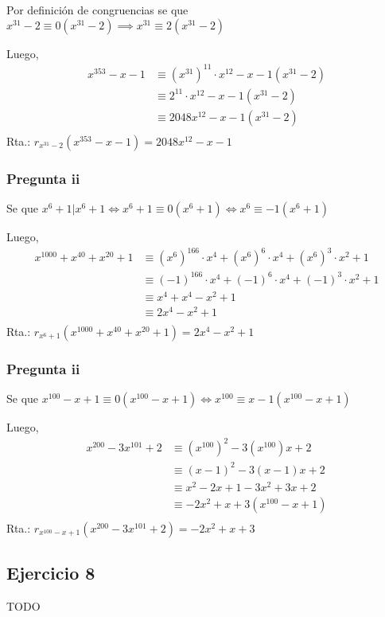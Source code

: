 Por definición de congruencias se que $ x^{31} - 2 \equiv 0(x^{31} - 2) \implies x^{31} \equiv 2(x^{31} - 2) $

Luego,
\begin{align*}
    x^{353} - x - 1 &\equiv (x^{31})^11 \cdot x^{12} - x - 1 (x^{31} - 2) \\
    &\equiv 2^11 \cdot x^{12} - x - 1 (x^{31} - 2) \\
    &\equiv 2048x^{12} - x - 1 (x^{31} - 2)\\
\end{align*}
Rta.: $ r_{x^{31} - 2}(x^{353} - x - 1) = 2048x^{12} - x - 1 $

\subsubsection{Pregunta ii}

Se que $ x^{6} + 1 | x^6 + 1 \iff x^6 + 1 \equiv 0 (x^6 + 1) \iff x^6 \equiv -1 (x^6 + 1) $

Luego,
\begin{align*}
    x^{1000} + x^{40} + x^{20} + 1 &\equiv (x^6)^{166} \cdot x^4 + (x^6)^6 \cdot x^4 + (x^6)^3 \cdot x^2 + 1 \\
    &\equiv (-1)^{166} \cdot x^4 + (-1)^6 \cdot x^4 + (-1)^3 \cdot x^2 + 1 \\
    &\equiv x^4 + x^4 - x^2 + 1 \\
    &\equiv 2x^4 - x^2 + 1 \\
\end{align*}
Rta.: $ r_{x^6 + 1}(x^{1000} + x^{40} + x^{20} + 1) = 2x^4 - x^2 + 1 $

\subsubsection{Pregunta ii}

Se que $ x^{100} - x + 1 \equiv 0 (x^{100} - x + 1) \iff x^{100} \equiv x-1(x^{100} -x + 1) $

Luego,
\begin{align*}
    x^{200} - 3x^{101} + 2 &\equiv (x^{100})^2 - 3(x^{100})x + 2 \\
    &\equiv (x-1)^2 - 3(x-1)x + 2 \\
    &\equiv x^2 - 2x + 1 - 3x^2 + 3x + 2 \\
    &\equiv -2x^2 + x + 3 (x^{100} -x + 1) \\
\end{align*}
Rta.: $ r_{x^{100} -x + 1}(x^{200} - 3x^{101} + 2) = -2x^2 + x + 3 $

\subsection{Ejercicio 8}
TODO


